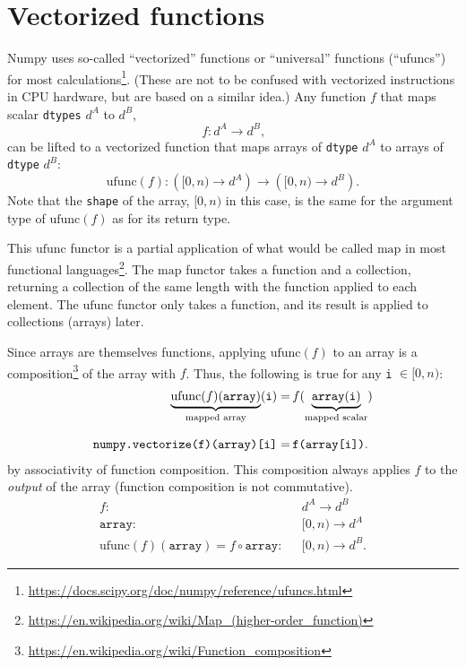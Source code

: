 \documentclass[12pt]{article}
\begin{document}
\section*{Vectorized functions}

Numpy uses so-called ``vectorized'' functions or ``universal'' functions (``ufuncs'') for most calculations\footnote{\url{https://docs.scipy.org/doc/numpy/reference/ufuncs.html}}. (These are not to be confused with vectorized instructions in CPU hardware, but are based on a similar idea.) Any function $f$ that maps scalar \texttt{dtypes} $d^A$ to $d^B$,
\[ f: d^A \to d^B\mbox{,} \]
\noindent can be lifted to a vectorized function that maps arrays of \texttt{dtype} $d^A$ to arrays of \texttt{dtype} $d^B$:
\[ \mbox{ufunc}(f): \left([0, n) \to d^A\right) \to \left([0, n) \to d^B\right)\mbox{.} \]
\noindent Note that the \texttt{shape} of the array, $[0, n)$ in this case, is the same for the argument type of $\mbox{ufunc}(f)$ as for its return type.

This $\mbox{ufunc}$ functor is a partial application of what would be called $\mbox{map}$ in most functional languages\footnote{\url{https://en.wikipedia.org/wiki/Map_(higher-order_function)}}. The $\mbox{map}$ functor takes a function and a collection, returning a collection of the same length with the function applied to each element. The $\mbox{ufunc}$ functor only takes a function, and its result is applied to collections (arrays) later.

Since arrays are themselves functions, applying $\mbox{ufunc}(f)$ to an array is a composition\footnote{\url{https://en.wikipedia.org/wiki/Function_composition}} of the array with $f$. Thus, the following is true for any \texttt{i} $\in [0, n)$:
\begin{align*}
\underbrace{\mbox{ufunc}(f)(\texttt{array})}_{\mbox{\scriptsize mapped array}}(\texttt{i}) = & \,f(\underbrace{\texttt{array}(\texttt{i})}_{\mbox{\scriptsize mapped scalar}}) \\[0.5\baselineskip]
\texttt{numpy.vectorize(f)(array)[i]} = & \,\texttt{f(array[i])}\mbox{.}
\end{align*}
\noindent by associativity of function composition. This composition always applies $f$ to the {\it output} of the array (function composition is not commutative).
\begin{align*}
f: & \mbox{ } d^A \to d^B \\
\texttt{array}: & \mbox{ } [0, n) \to d^A \\
\mbox{ufunc}(f)(\texttt{array}) = f \circ \texttt{array} : & \mbox{ } [0, n) \to d^B\mbox{.}
\end{align*}
\end{document}
